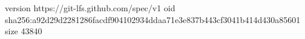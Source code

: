 version https://git-lfs.github.com/spec/v1
oid sha256:a92d29d2281286facdf904102934ddaa71e3e837b443cf3041b414d430a85601
size 43840
